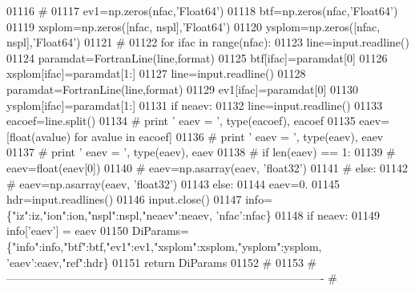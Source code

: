 \begin{DoxyCode}
01116     \textcolor{comment}{#}
01117     ev1=np.zeros(nfac,\textcolor{stringliteral}{'Float64'})
01118     btf=np.zeros(nfac,\textcolor{stringliteral}{'Float64'})
01119     xsplom=np.zeros([nfac, nspl],\textcolor{stringliteral}{'Float64'})
01120     ysplom=np.zeros([nfac, nspl],\textcolor{stringliteral}{'Float64'})
01121     \textcolor{comment}{#}
01122     \textcolor{keywordflow}{for} ifac \textcolor{keywordflow}{in} range(nfac):
01123         line=input.readline()
01124         paramdat=FortranLine(line,format)
01125         btf[ifac]=paramdat[0]
01126         xsplom[ifac]=paramdat[1:]
01127         line=input.readline()
01128         paramdat=FortranLine(line,format)
01129         ev1[ifac]=paramdat[0]
01130         ysplom[ifac]=paramdat[1:]
01131     \textcolor{keywordflow}{if} neaev:
01132         line=input.readline()
01133         eacoef=line.split()
01134 \textcolor{comment}{#            print ' eaev = ', type(eacoef), eacoef}
01135         eaev=[float(avalue) \textcolor{keywordflow}{for} avalue \textcolor{keywordflow}{in} eacoef]
01136 \textcolor{comment}{#            print ' eaev = ', type(eaev), eaev}
01137 \textcolor{comment}{#            print ' eaev = ', type(eaev), eaev}
01138 \textcolor{comment}{#            if len(eaev) == 1:}
01139 \textcolor{comment}{#                eaev=float(eaev[0])}
01140 \textcolor{comment}{#                eaev=np.asarray(eaev, 'float32')}
01141 \textcolor{comment}{#            else:}
01142 \textcolor{comment}{#                eaev=np.asarray(eaev, 'float32')}
01143     \textcolor{keywordflow}{else}:
01144         eaev=0.
01145     hdr=input.readlines()
01146     input.close()
01147     info=\{\textcolor{stringliteral}{"iz"}:iz,\textcolor{stringliteral}{"ion"}:ion,\textcolor{stringliteral}{"nspl"}:nspl,\textcolor{stringliteral}{"neaev"}:neaev, \textcolor{stringliteral}{'nfac'}:nfac\}
01148     \textcolor{keywordflow}{if} neaev:
01149         info[\textcolor{stringliteral}{'eaev'}] = eaev
01150     DiParams=\{\textcolor{stringliteral}{"info"}:info,\textcolor{stringliteral}{"btf"}:btf,\textcolor{stringliteral}{"ev1"}:ev1,\textcolor{stringliteral}{"xsplom"}:xsplom,\textcolor{stringliteral}{"ysplom"}:ysplom, \textcolor{stringliteral}{'eaev'}:eaev,\textcolor{stringliteral}{"ref"}:hdr\}
01151     \textcolor{keywordflow}{return} DiParams
01152     \textcolor{comment}{#}
01153     \textcolor{comment}{# -------------------------------------------------------------------------------------}
    \textcolor{comment}{#}
\end{DoxyCode}
